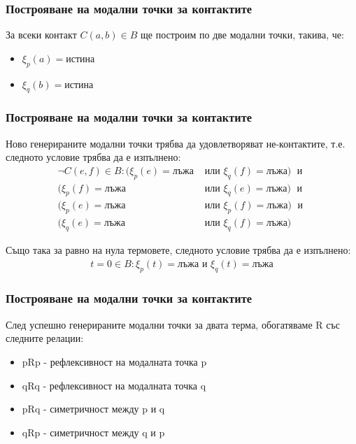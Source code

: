 \documentclass{beamer}
\newcommand{\vBool}{\xi}
\begin{document}
\begin{frame}\frametitle{Построяване на модални точки за контактите}
	За всеки контакт $C(a, b) \in B$ ще построим по две модални точки, такива, че:
		\begin{itemize}
			\item $\vBool_{p}(a) = \textbf{истина}$
			\item $\vBool_{q}(b) = \textbf{истина}$
		\end{itemize}
\end{frame}

\begin{frame}\frametitle{Построяване на модални точки за контактите}
	Ново генерираните модални точки трябва да удовлетворяват не-контактите, т.е. следното условие трябва да е изпълнено:
		\begin{align*}
			 \neg C(e, f) \in B: (\vBool_{p}(e) = \textbf{лъжа} & \textit{ или } \vBool_{q}(f) = \textbf{лъжа}) \; \textit{ и } \\
				(\vBool_{p}(f) = \textbf{лъжа} & \textit{ или } \vBool_{q}(e) = \textbf{лъжа}) \; \textit{ и } \\
				(\vBool_{p}(e) = \textbf{лъжа} & \textit{ или } \vBool_{p}(f) = \textbf{лъжа}) \; \textit{ и } \\
				(\vBool_{q}(e) = \textbf{лъжа} & \textit{ или } \vBool_{q}(f) = \textbf{лъжа})
		\end{align*}

	Също така за равно на нула термовете, следното условие трябва да е изпълнено:
	\begin{align*}
		t = 0 \in B: \vBool_{p}(t) = \textit{лъжа} \text{ и }  \vBool_{q}(t) = \textit{лъжа}
	\end{align*}
\end{frame}

\begin{frame}\frametitle{Построяване на модални точки за контактите}
	След успешно генерираните модални точки за двата терма, обогатяваме R със следните релации:
	\begin{itemize}
		\item pRp - рефлексивност на модалната точка p
		\item qRq - рефлексивност на модалната точка q
		\item pRq - симетричност между p и q
		\item qRp - симетричност между q и p
	\end{itemize}
\end{frame}
\end{document}

